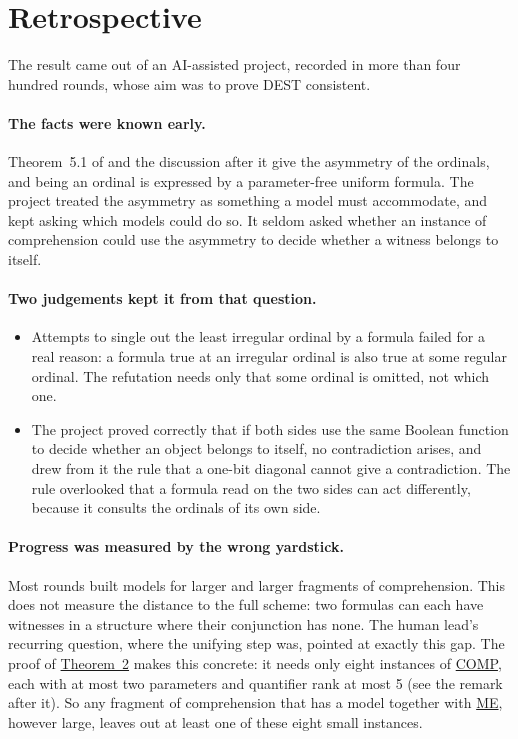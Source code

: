 \documentclass[11pt,a4paper]{article}
\theoremstyle{definition}
\theoremstyle{remark}
\newcommand{\ME}{\textup{ME}}
\newcommand{\COMP}{\textup{COMP}}
\newcommand{\DEST}{\textup{DEST}}
\begin{document}
\section{Retrospective}\label{sec:7}

The result came out of an AI-assisted project, recorded in more than four hundred rounds, whose aim was to prove \DEST{} consistent.

\paragraph{The facts were known early.} Theorem~5.1 of \cite{H05} and the discussion after it give the asymmetry of the ordinals, and being an ordinal is expressed by a parameter-free uniform formula. The project treated the asymmetry as something a model must accommodate, and kept asking which models could do so. It seldom asked whether an instance of comprehension could use the asymmetry to decide whether a witness belongs to itself.

\paragraph{Two judgements kept it from that question.}
\begin{itemize}
\item Attempts to single out the least irregular ordinal by a formula failed for a real reason: a formula true at an irregular ordinal is also true at some regular ordinal. The refutation needs only that some ordinal is omitted, not which one.
\item The project proved correctly that if both sides use the same Boolean function to decide whether an object belongs to itself, no contradiction arises, and drew from it the rule that a one-bit diagonal cannot give a contradiction. The rule overlooked that a formula read on the two sides can act differently, because it consults the ordinals of its own side.
\end{itemize}

\paragraph{Progress was measured by the wrong yardstick.} Most rounds built models for larger and larger fragments of comprehension. This does not measure the distance to the full scheme: two formulas can each have witnesses in a structure where their conjunction has none. The human lead's recurring question, where the unifying step was, pointed at exactly this gap. The proof of {\hyperref[thm:2]{Theorem~2}} makes this concrete: it needs only eight instances of {\hyperref[ax:COMP]{\COMP}}, each with at most two parameters and quantifier rank at most 5 (see the remark after it). So any fragment of comprehension that has a model together with {\hyperref[ax:ME]{\ME}}, however large, leaves out at least one of these eight small instances.
\end{document}
